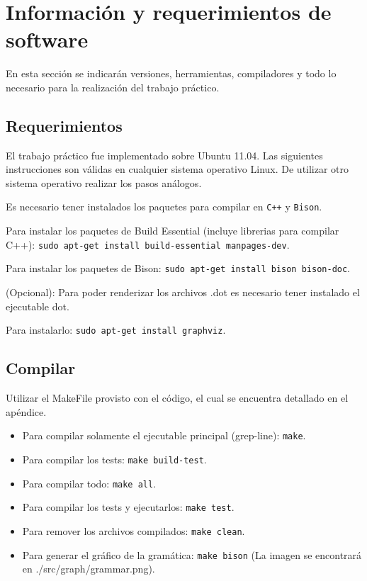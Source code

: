 \section{Información y requerimientos de software}

En esta sección se indicarán versiones, herramientas, compiladores y todo lo 
necesario para la realización del trabajo práctico.

\subsection{Requerimientos}

El trabajo práctico fue implementado sobre Ubuntu 11.04. Las siguientes instrucciones
 son válidas en cualquier sistema operativo Linux. De utilizar otro sistema 
 operativo realizar los pasos análogos.

Es necesario tener instalados los paquetes para compilar en \texttt{C++} y \texttt{Bison}.

Para instalar los paquetes de Build Essential (incluye librerias para compilar C++): \texttt{sudo apt-get install build-essential manpages-dev}.

Para instalar los paquetes de Bison: \texttt{sudo apt-get install bison bison-doc}.

(Opcional): Para poder renderizar los archivos .dot es necesario tener instalado el ejecutable dot. 

Para instalarlo: \texttt{sudo apt-get install graphviz}.

\subsection{Compilar}

Utilizar el MakeFile provisto con el código, el cual se encuentra detallado en el apéndice.

\begin{itemize}

 \item Para compilar solamente el ejecutable principal (grep-line): \texttt{make}.

 \item Para compilar los tests: \texttt{make build-test}.
 
 \item Para compilar todo: \texttt{make all}.

 \item Para compilar los tests y ejecutarlos: \texttt{make test}.

 \item Para remover los archivos compilados: \texttt{make clean}. 

 \item Para generar el gráfico de la gramática: \texttt{make bison} (La imagen se encontrará en ./src/graph/grammar.png).

\end{itemize}

